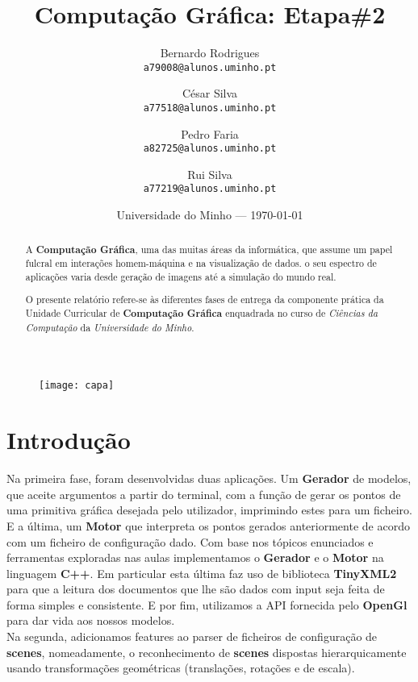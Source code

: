 \documentclass{article}
\title{Computação Gráfica: Etapa\#2} %
\author{Bernardo Rodrigues\\ \texttt{a79008@alunos.uminho.pt}\\ \and César Silva\\ \texttt{a77518@alunos.uminho.pt}\\ \and Pedro Faria\\ \texttt{a82725@alunos.uminho.pt} \and Rui Silva\\ \texttt{a77219@alunos.uminho.pt}\\} %
\date{Universidade do Minho --- \today} %
\begin{document}
\maketitle 
\begin{figure}[H]
	\centering
	\texttt{[image: capa]}
\end{figure}
\newpage

\begin{abstract}
A \textbf{Computação Gráfica}, uma das muitas áreas da informática, que assume um papel fulcral em interações homem-máquina e na visualização de dados. o seu espectro de aplicações varia desde geração de imagens até a simulação do mundo real. \par
	O presente relatório refere-se às diferentes fases de entrega da componente prática da Unidade Curricular de \textbf{Computação Gráfica} enquadrada no curso de \textit{Ciências da Computação} da \textit{Universidade do Minho}. 
\end{abstract}
\newpage


\tableofcontents{}
\newpage



\section{Introdução}
Na primeira fase, foram desenvolvidas duas aplicações. Um \textbf{Gerador} de modelos, que aceite argumentos a partir do terminal, com a função de gerar os pontos de uma primitiva gráfica desejada pelo utilizador, imprimindo estes para um ficheiro. E a última, um \textbf{Motor} que interpreta os pontos gerados anteriormente de acordo com um ficheiro de configuração dado. 
Com base nos tópicos enunciados e ferramentas exploradas nas aulas implementamos o \textbf{Gerador} e o \textbf{Motor} na linguagem \textbf{C++}. Em particular esta última faz uso de biblioteca \textbf{TinyXML2} para que a leitura dos documentos que lhe são dados com input seja feita de forma simples e consistente. E por fim,  utilizamos a API fornecida pelo \textbf{OpenGl} para dar vida aos nossos modelos.\\
Na segunda, adicionamos features ao parser de ficheiros de configuração de \textbf{scenes}, nomeadamente, o reconhecimento de \textbf{scenes} dispostas hierarquicamente usando transformações geométricas (translações, rotações e de escala).
\newpage
\end{document}
